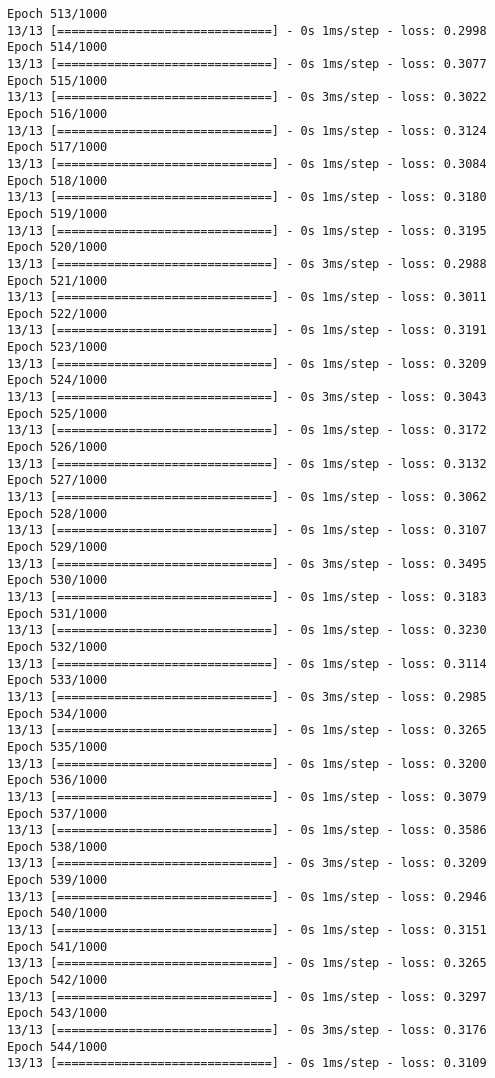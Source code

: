 \documentclass[11pt]{article}
\begin{document}
\begin{Verbatim}[commandchars=\\\{\}]
Epoch 513/1000
13/13 [==============================] - 0s 1ms/step - loss: 0.2998
Epoch 514/1000
13/13 [==============================] - 0s 1ms/step - loss: 0.3077
Epoch 515/1000
13/13 [==============================] - 0s 3ms/step - loss: 0.3022
Epoch 516/1000
13/13 [==============================] - 0s 1ms/step - loss: 0.3124
Epoch 517/1000
13/13 [==============================] - 0s 1ms/step - loss: 0.3084
Epoch 518/1000
13/13 [==============================] - 0s 1ms/step - loss: 0.3180
Epoch 519/1000
13/13 [==============================] - 0s 1ms/step - loss: 0.3195
Epoch 520/1000
13/13 [==============================] - 0s 3ms/step - loss: 0.2988
Epoch 521/1000
13/13 [==============================] - 0s 1ms/step - loss: 0.3011
Epoch 522/1000
13/13 [==============================] - 0s 1ms/step - loss: 0.3191
Epoch 523/1000
13/13 [==============================] - 0s 1ms/step - loss: 0.3209
Epoch 524/1000
13/13 [==============================] - 0s 3ms/step - loss: 0.3043
Epoch 525/1000
13/13 [==============================] - 0s 1ms/step - loss: 0.3172
Epoch 526/1000
13/13 [==============================] - 0s 1ms/step - loss: 0.3132
Epoch 527/1000
13/13 [==============================] - 0s 1ms/step - loss: 0.3062
Epoch 528/1000
13/13 [==============================] - 0s 1ms/step - loss: 0.3107
Epoch 529/1000
13/13 [==============================] - 0s 3ms/step - loss: 0.3495
Epoch 530/1000
13/13 [==============================] - 0s 1ms/step - loss: 0.3183
Epoch 531/1000
13/13 [==============================] - 0s 1ms/step - loss: 0.3230
Epoch 532/1000
13/13 [==============================] - 0s 1ms/step - loss: 0.3114
Epoch 533/1000
13/13 [==============================] - 0s 3ms/step - loss: 0.2985
Epoch 534/1000
13/13 [==============================] - 0s 1ms/step - loss: 0.3265
Epoch 535/1000
13/13 [==============================] - 0s 1ms/step - loss: 0.3200
Epoch 536/1000
13/13 [==============================] - 0s 1ms/step - loss: 0.3079
Epoch 537/1000
13/13 [==============================] - 0s 1ms/step - loss: 0.3586
Epoch 538/1000
13/13 [==============================] - 0s 3ms/step - loss: 0.3209
Epoch 539/1000
13/13 [==============================] - 0s 1ms/step - loss: 0.2946
Epoch 540/1000
13/13 [==============================] - 0s 1ms/step - loss: 0.3151
Epoch 541/1000
13/13 [==============================] - 0s 1ms/step - loss: 0.3265
Epoch 542/1000
13/13 [==============================] - 0s 1ms/step - loss: 0.3297
Epoch 543/1000
13/13 [==============================] - 0s 3ms/step - loss: 0.3176
Epoch 544/1000
13/13 [==============================] - 0s 1ms/step - loss: 0.3109

\end{Verbatim}
\end{document}

